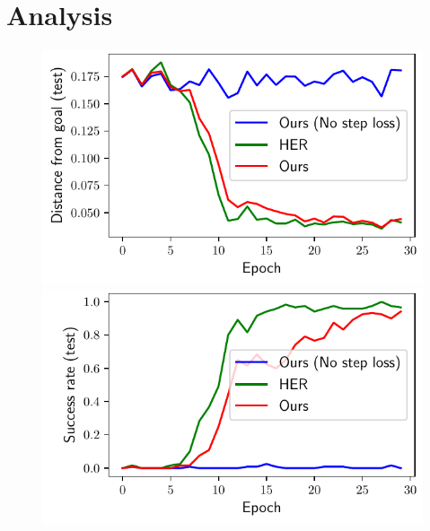 \section{Analysis}
%
\begin{figure}%
  \def\frac{0.24}
  \begin{minipage}[b]{0.5\linewidth}
    \includegraphics[width=\frac\columnwidth]{media/res/ablate-ddpg-with-without-step-loss/FetchPush-6efc1de-ddpgepoch-test/ag_g_dist.pdf}%
    \includegraphics[width=\frac\columnwidth]{media/res/ablate-ddpg-with-without-step-loss/FetchPush-6efc1de-ddpgepoch-test/success_rate.pdf}%
    \label{fig:with-and-without-step-loss-a}
  \end{minipage}
  \begin{minipage}[b]{0.5\linewidth}

\end{minipage}
\end{figure}
